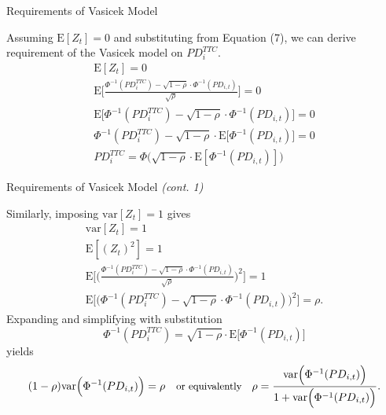 \documentclass{beamer}
\begin{document}
\begin{frame}{Requirements of Vasicek Model}
\justifying
\small

Assuming $\mathrm{E}[Z_t] = 0$ and substituting from Equation (7), we can derive requirement of the Vasicek model on $PD_i^{TTC}$.
{\tiny
\begin{equation*}
\begin{aligned}
\mathrm{E}[Z_t] = 0 \\
\mathrm{E} \Bigg[\frac{\Phi^{-1}(PD_i^{TTC}) - \sqrt{1 - \rho} \cdot \Phi^{-1}(PD_{i, t})}{\sqrt{\rho}} \Bigg] = 0 \\
\mathrm{E} \Big[\Phi^{-1}(PD_i^{TTC}) - \sqrt{1 - \rho} \cdot \Phi^{-1}(PD_{i, t}) \Big] = 0 \\
\Phi^{-1}(PD_i^{TTC}) - \sqrt{1 - \rho} \cdot \mathrm{E} \Big[\Phi^{-1}(PD_{i, t}) \Big] = 0 \\
PD_i^{TTC} = \Phi \Big( \sqrt{1 - \rho} \cdot \mathrm{E} [\Phi^{-1}(PD_{i, t})] \Big)
\end{aligned}
\end{equation*}
}

\end{frame}

\begin{frame}{Requirements of Vasicek Model \textit{(cont. 1)}}
\justifying
\small

Similarly, imposing $\mathrm{var}[Z_t] = 1$ gives
{\tiny
\begin{equation*}
\begin{aligned}
\mathrm{var}[Z_t] = 1 \\
\mathrm{E}[(Z_t)^2] = 1 \\
\mathrm{E} \Bigg[\Bigg(\frac{\Phi^{-1}(PD_i^{TTC}) - \sqrt{1 - \rho} \cdot \Phi^{-1}(PD_{i,t})}{\sqrt{\rho}}\Bigg)^2\Bigg] = 1 \\
\mathrm{E} \Bigg[\Bigg(\Phi^{-1}(PD_i^{TTC}) - \sqrt{1 - \rho} \cdot \Phi^{-1}(PD_{i,t})\Bigg)^2\Bigg] = \rho.
\end{aligned}
\end{equation*}
}
Expanding and simplifying with substitution
{\tiny
\begin{equation*}
\Phi^{-1}(PD_i^{TTC}) = \sqrt{1 - \rho} \cdot \mathrm{E} \Big[\Phi^{-1}(PD_{i, t}) \Big]
\end{equation*}
}
yields
{\tiny
\begin{equation*}
(1 - \rho)  \mathrm{var}\Big( \Phi^{-1}(PD_{i, t}) \Big) = \rho
\quad \small{\text{or equivalently}} \quad
\rho = \frac{\mathrm{var} \Big( \Phi^{-1}(PD_{i, t}) \Big)}{1 + \mathrm{var} \Big(\Phi^{-1}(PD_{i, t}) \Big)}.
\end{equation*}
}

\end{frame}
\end{document}
